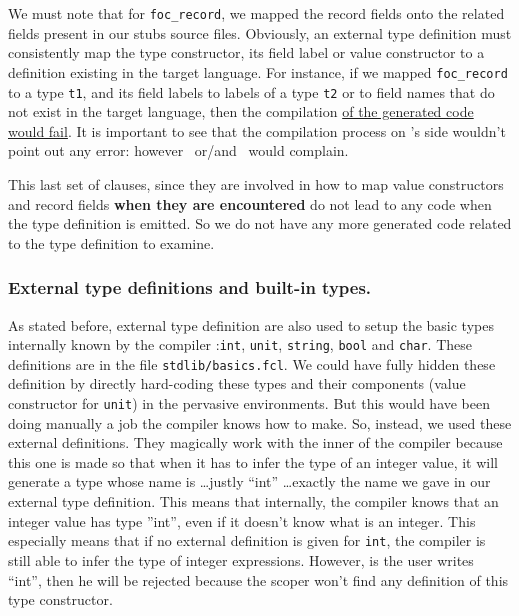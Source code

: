 We must note that for {\tt foc\_record}, we mapped the record fields
onto the related fields present in our stubs source files. Obviously,
an external type definition must consistently map the type
constructor, its field label or value constructor to a definition
existing in the target language. For instance, if we mapped
{\tt foc\_record} to a type {\tt t1}, and its field labels to labels
of a type {\tt t2} or to field names that do not exist in the target
language, then the compilation \underline{of the generated code would
fail}. It is important to see that the compilation process on
\focalize's side wouldn't point out any error: however \coq\ or/and
\ocaml\ would complain.

\medskip
This last set of clauses, since they are involved in how to map value
constructors and record fields {\bf when they are encountered} do not
lead to any code when the type definition is emitted. So we do not
have any more generated code related to the type definition to
examine.



\subsubsection{External type definitions and built-in types.}
\label{external-ty-defs-and-builtin-tys}
As stated before, external type definition are also used to setup the
basic types internally known by the compiler :{\tt int}, {\tt unit},
{\tt string}, {\tt bool} and {\tt char}. These definitions are in the
file {\tt stdlib/basics.fcl}. We could have fully hidden these
definition by directly hard-coding these types and their components
(value constructor for {\tt unit}) in the pervasive environments. But
this would have been doing manually a job the compiler knows how to
make. So, instead, we used these external definitions. They magically
work with the inner of the compiler because this one is made so that
when it has to infer the type of an integer value, it will generate a
type whose name is \ldots justly ``int'' \ldots exactly the name we
gave in our external type definition. This means that internally, the
compiler knows that an integer value has type ''int'', even if it
doesn't know what is an integer. This especially means that if no
external definition is given for {\tt int}, the compiler is still able
to infer the type of integer expressions. However, is the user writes
``int'', then he will be rejected because the scoper won't find any
definition of this type constructor.

